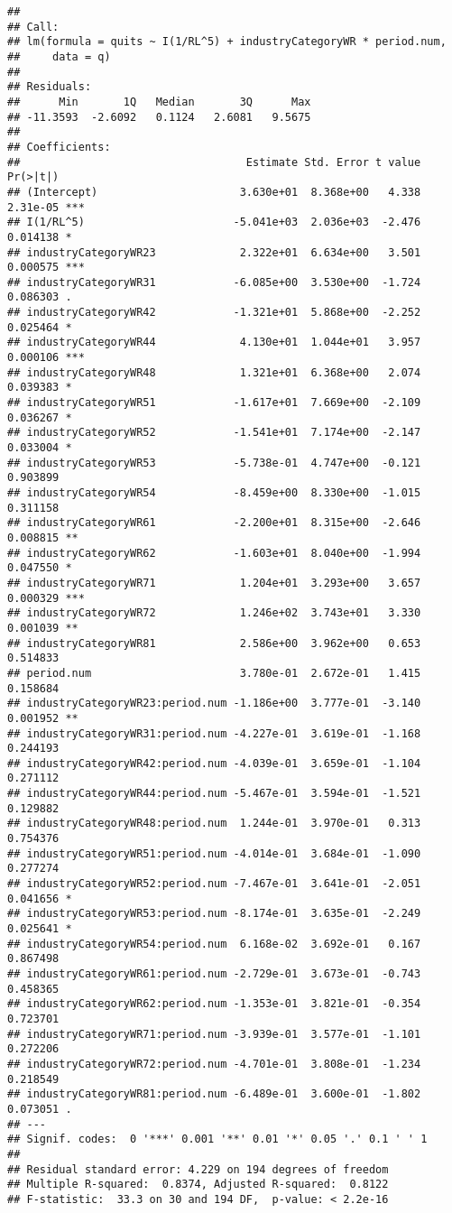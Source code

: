 \documentclass[
]{article}
\begin{document}
\begin{verbatim}
## 
## Call:
## lm(formula = quits ~ I(1/RL^5) + industryCategoryWR * period.num, 
##     data = q)
## 
## Residuals:
##      Min       1Q   Median       3Q      Max 
## -11.3593  -2.6092   0.1124   2.6081   9.5675 
## 
## Coefficients:
##                                   Estimate Std. Error t value Pr(>|t|)    
## (Intercept)                      3.630e+01  8.368e+00   4.338 2.31e-05 ***
## I(1/RL^5)                       -5.041e+03  2.036e+03  -2.476 0.014138 *  
## industryCategoryWR23             2.322e+01  6.634e+00   3.501 0.000575 ***
## industryCategoryWR31            -6.085e+00  3.530e+00  -1.724 0.086303 .  
## industryCategoryWR42            -1.321e+01  5.868e+00  -2.252 0.025464 *  
## industryCategoryWR44             4.130e+01  1.044e+01   3.957 0.000106 ***
## industryCategoryWR48             1.321e+01  6.368e+00   2.074 0.039383 *  
## industryCategoryWR51            -1.617e+01  7.669e+00  -2.109 0.036267 *  
## industryCategoryWR52            -1.541e+01  7.174e+00  -2.147 0.033004 *  
## industryCategoryWR53            -5.738e-01  4.747e+00  -0.121 0.903899    
## industryCategoryWR54            -8.459e+00  8.330e+00  -1.015 0.311158    
## industryCategoryWR61            -2.200e+01  8.315e+00  -2.646 0.008815 ** 
## industryCategoryWR62            -1.603e+01  8.040e+00  -1.994 0.047550 *  
## industryCategoryWR71             1.204e+01  3.293e+00   3.657 0.000329 ***
## industryCategoryWR72             1.246e+02  3.743e+01   3.330 0.001039 ** 
## industryCategoryWR81             2.586e+00  3.962e+00   0.653 0.514833    
## period.num                       3.780e-01  2.672e-01   1.415 0.158684    
## industryCategoryWR23:period.num -1.186e+00  3.777e-01  -3.140 0.001952 ** 
## industryCategoryWR31:period.num -4.227e-01  3.619e-01  -1.168 0.244193    
## industryCategoryWR42:period.num -4.039e-01  3.659e-01  -1.104 0.271112    
## industryCategoryWR44:period.num -5.467e-01  3.594e-01  -1.521 0.129882    
## industryCategoryWR48:period.num  1.244e-01  3.970e-01   0.313 0.754376    
## industryCategoryWR51:period.num -4.014e-01  3.684e-01  -1.090 0.277274    
## industryCategoryWR52:period.num -7.467e-01  3.641e-01  -2.051 0.041656 *  
## industryCategoryWR53:period.num -8.174e-01  3.635e-01  -2.249 0.025641 *  
## industryCategoryWR54:period.num  6.168e-02  3.692e-01   0.167 0.867498    
## industryCategoryWR61:period.num -2.729e-01  3.673e-01  -0.743 0.458365    
## industryCategoryWR62:period.num -1.353e-01  3.821e-01  -0.354 0.723701    
## industryCategoryWR71:period.num -3.939e-01  3.577e-01  -1.101 0.272206    
## industryCategoryWR72:period.num -4.701e-01  3.808e-01  -1.234 0.218549    
## industryCategoryWR81:period.num -6.489e-01  3.600e-01  -1.802 0.073051 .  
## ---
## Signif. codes:  0 '***' 0.001 '**' 0.01 '*' 0.05 '.' 0.1 ' ' 1
## 
## Residual standard error: 4.229 on 194 degrees of freedom
## Multiple R-squared:  0.8374, Adjusted R-squared:  0.8122 
## F-statistic:  33.3 on 30 and 194 DF,  p-value: < 2.2e-16
\end{verbatim}
\end{document}
